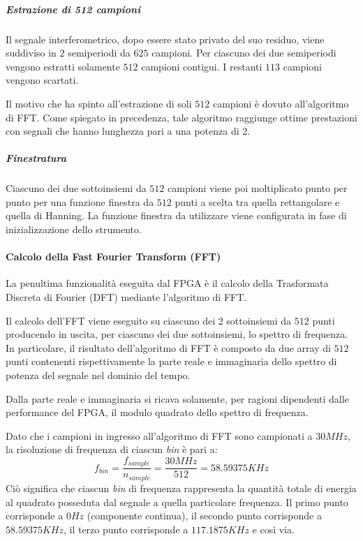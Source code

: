 \subparagraph{Estrazione di 512 campioni}
Il segnale interferometrico, dopo essere stato privato del suo residuo, viene suddiviso in $2$ semiperiodi da $625$ campioni. Per ciascuno dei due semiperiodi vengono estratti solamente $512$ campioni contigui. I restanti $113$ campioni vengono scartati. 

Il motivo che ha spinto all'estrazione di soli $512$ campioni è dovuto all'algoritmo di FFT. Come spiegato in precedenza, tale algoritmo raggiunge ottime prestazioni con segnali che hanno lunghezza pari a una potenza di 2.

\subparagraph{Finestratura}
Ciascuno dei due sottoinsiemi da $512$ campioni viene poi moltiplicato punto per punto per una funzione finestra da $512$ punti a scelta tra quella rettangolare e quella di Hanning. La funzione finestra da utilizzare viene configurata in fase di inizializzazione dello strumento.

\paragraph{Calcolo della Fast Fourier Transform (FFT)}
La penultima funzionalità eseguita dal FPGA è il calcolo della Trasformata Discreta di Fourier (DFT) mediante l'algoritmo di FFT.

Il calcolo dell'FFT viene eseguito su ciascuno dei 2 sottoinsiemi da $512$ punti producendo in uscita, per ciascuno dei due sottoinsiemi, lo spettro di frequenza. In particolare, il risultato dell'algoritmo di FFT è composto da due array di $512$ punti contenenti rispettivamente la parte reale e immaginaria dello spettro di potenza del segnale nel dominio del tempo.

Dalla parte reale e immaginaria si ricava solamente, per ragioni dipendenti dalle performance del FPGA, il modulo quadrato dello spettro di frequenza.

Dato che i campioni in ingresso all'algoritmo di FFT sono campionati a $30MHz$, la risoluzione di frequenza di ciascun \textit{bin} è pari a:
\begin{equation}
	f_{bin} = \frac{f_{sample}}{n_{sample}} = \frac{30MHz}{512} = 58.59375 KHz
\end{equation}
Ciò significa che ciascun \textit{bin} di frequenza rappresenta la quantità totale di energia al quadrato posseduta dal segnale a quella particolare frequenza. Il primo punto corrisponde a $0Hz$ (componente continua), il secondo punto corrisponde a $58.59375 KHz$, il terzo punto corrisponde a $117.1875KHz$ e così via.

